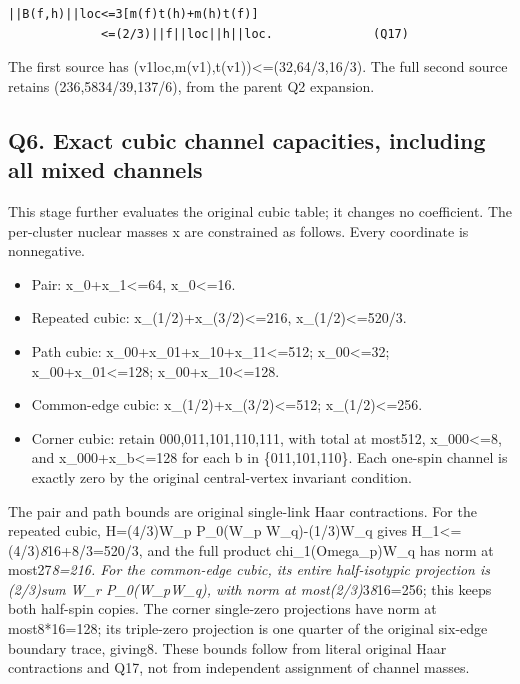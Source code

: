 \documentclass[11pt,a4paper]{article}
\providecommand{\tightlist}{\setlength{\itemsep}{0pt}\setlength{\parskip}{0pt}}
\renewcommand{\[}{\begingroup\small\originaldisplaystart}
\renewcommand{\]}{\originaldisplayend\endgroup}
\begin{document}
\begin{verbatim}
||B(f,h)||loc<=3[m(f)t(h)+m(h)t(f)]
             <=(2/3)||f||loc||h||loc.              (Q17)
\end{verbatim}

The first source has
(\textbar\textbar v1\textbar\textbar loc,m(v1),t(v1))\textless=(32,64/3,16/3).
The full second source retains (236,5834/39,137/6), from the parent Q2
expansion.

\subsection{Q6. Exact cubic channel capacities, including all mixed
channels}\label{q6.-exact-cubic-channel-capacities-including-all-mixed-channels}

This stage further evaluates the original cubic table; it changes no
coefficient. The per-cluster nuclear masses x are constrained as
follows. Every coordinate is nonnegative.

\begin{itemize}
\tightlist
\item
  Pair: x\_0+x\_1\textless=64, x\_0\textless=16.
\item
  Repeated cubic: x\_(1/2)+x\_(3/2)\textless=216,
  x\_(1/2)\textless=520/3.
\item
  Path cubic: x\_00+x\_01+x\_10+x\_11\textless=512; x\_00\textless=32;
  x\_00+x\_01\textless=128; x\_00+x\_10\textless=128.
\item
  Common-edge cubic: x\_(1/2)+x\_(3/2)\textless=512;
  x\_(1/2)\textless=256.
\item
  Corner cubic: retain 000,011,101,110,111, with total at most512,
  x\_000\textless=8, and x\_000+x\_b\textless=128 for each b in
  \{011,101,110\}. Each one-spin channel is exactly zero by the original
  central-vertex invariant condition.
\end{itemize}

The pair and path bounds are original single-link Haar contractions. For
the repeated cubic, H=(4/3)W\_p P\_0(W\_p W\_q)-(1/3)W\_q gives
\textbar\textbar H\textbar\textbar\_1\textless=(4/3)\emph{8}16+8/3=520/3,
and the full product chi\_1(Omega\_p)W\_q has norm at most27\emph{8=216.
For the common-edge cubic, its entire half-isotypic projection is
(2/3)sum W\_r P\_0(W\_pW\_q), with norm at most(2/3)}3\emph{8}16=256;
this keeps both half-spin copies. The corner single-zero projections
have norm at most8*16=128; its triple-zero projection is one quarter of
the original six-edge boundary trace, giving8. These bounds follow from
literal original Haar contractions and Q17, not from independent
assignment of channel masses.
\end{document}
